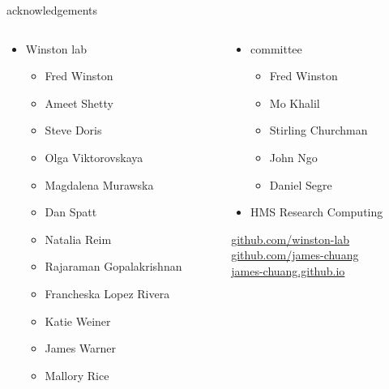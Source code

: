 \documentclass[aspectratio=169]{beamer}
\begin{document}
\begin{frame}{acknowledgements}
    \begin{columns}
        \begin{column}{0.5\textwidth}
            \begin{itemize}
                \item Winston lab
                    \begin{itemize}
                        \item Fred Winston
                        \item Ameet Shetty
                        \item Steve Doris
                        \item Olga Viktorovskaya
                        \item Magdalena Murawska
                        \item Dan Spatt
                        \item Natalia Reim
                        \item Rajaraman Gopalakrishnan
                        \item Francheska Lopez Rivera
                        \item Katie Weiner
                        \item James Warner
                        \item Mallory Rice
                    \end{itemize}
            \end{itemize}
        \end{column}
        \begin{column}{0.5\textwidth}
            \begin{itemize}
                \item committee
                    \begin{itemize}
                        \item Fred Winston
                        \item Mo Khalil
                        \item Stirling Churchman
                        \item John Ngo
                        \item Daniel Segre
                    \end{itemize}
                \item HMS Research Computing
            \end{itemize}
            \begin{description}
                \item [\href{https://github.com/winston-lab}{github.com/winston-lab}]
                \item [\href{https://github.com/james-chuang}{github.com/james-chuang}]
                \item [\href{https://james-chuang.github.io}{james-chuang.github.io}]
            \end{description}
        \end{column}
    \end{columns}
\end{frame}
\end{document}
